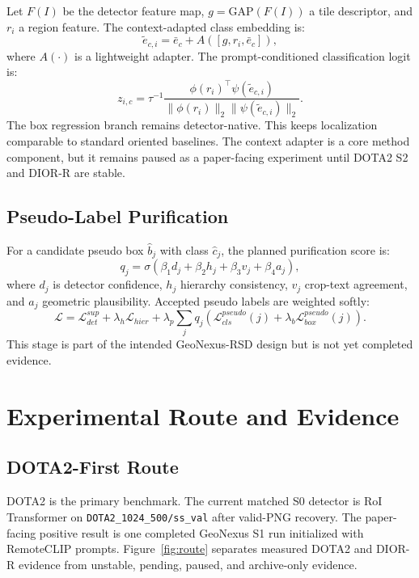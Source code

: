 \documentclass[10pt]{article}
\begin{document}
Let $F(I)$ be the detector feature map, $g=\mathrm{GAP}(F(I))$ a tile descriptor, and $r_i$ a region feature. The context-adapted class embedding is:
\begin{equation}
    \tilde{e}_{c,i}=\bar{e}_c + A([g,r_i,\bar{e}_c]),
\end{equation}
where $A(\cdot)$ is a lightweight adapter. The prompt-conditioned classification logit is:
\begin{equation}
    z_{i,c}=\tau^{-1}
    \frac{\phi(r_i)^{\top}\psi(\tilde{e}_{c,i})}
    {\|\phi(r_i)\|_2\|\psi(\tilde{e}_{c,i})\|_2}.
\end{equation}
The box regression branch remains detector-native. This keeps localization comparable to standard oriented baselines. The context adapter is a core method component, but it remains paused as a paper-facing experiment until DOTA2 S2 and DIOR-R are stable.

\subsection{Pseudo-Label Purification}

For a candidate pseudo box $\hat{b}_j$ with class $\hat{c}_j$, the planned purification score is:
\begin{equation}
    q_j=\sigma(\beta_1 d_j+\beta_2 h_j+\beta_3 v_j+\beta_4 a_j),
\end{equation}
where $d_j$ is detector confidence, $h_j$ hierarchy consistency, $v_j$ crop-text agreement, and $a_j$ geometric plausibility. Accepted pseudo labels are weighted softly:
\begin{equation}
    \mathcal{L}=\mathcal{L}_{det}^{sup}
    +\lambda_h\mathcal{L}_{hier}
    +\lambda_p\sum_j q_j\left(
    \mathcal{L}_{cls}^{pseudo}(j)+\lambda_b\mathcal{L}_{box}^{pseudo}(j)\right).
\end{equation}
This stage is part of the intended GeoNexus-RSD design but is not yet completed evidence.

\section{Experimental Route and Evidence}

\subsection{DOTA2-First Route}

DOTA2 is the primary benchmark. The current matched S0 detector is RoI Transformer on \texttt{DOTA2\_1024\_500/ss\_val} after valid-PNG recovery. The paper-facing positive result is one completed GeoNexus S1 run initialized with RemoteCLIP prompts. Figure~\ref{fig:route} separates measured DOTA2 and DIOR-R evidence from unstable, pending, paused, and archive-only evidence.
\end{document}
